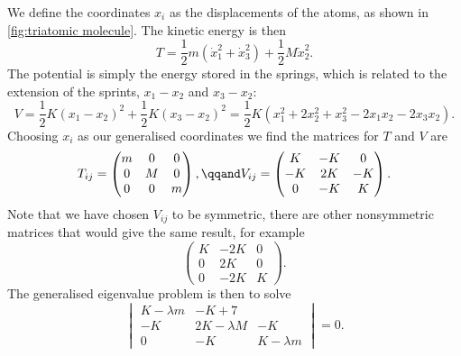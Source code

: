 \documentclass[fleqn]{NotesClass}
\begin{document}
    We define the coordinates \(x_i\) as the displacements of the atoms, as shown in \cref{fig:triatomic molecule}.
    The kinetic energy is then
    \begin{equation}
        T = \frac{1}{2}m(\dot{x}_1^2 + \dot{x}_3^2) + \frac{1}{2}M\dot{x}_2^2.
    \end{equation}
    The potential is simply the energy stored in the springs, which is related to the extension of the sprints, \(x_1 - x_2\) and \(x_3 - x_2\):
    \begin{equation}
        V = \frac{1}{2}K(x_1 - x_2)^2 + \frac{1}{2}K(x_3 - x_2)^2 = \frac{1}{2}K(x_1^2 + 2x_2^2 + x_3^2 - 2x_1x_2 - 2x_3x_2).
    \end{equation}
    Choosing \(x_i\) as our generalised coordinates we find the matrices for \(T\) and \(V\) are
    \begin{equation}
        T_{ij} = 
        \begin{pmatrix}
            m & 0 & 0\\
            0 & M & 0\\
            0 & 0 & m
        \end{pmatrix}
        , \qqand V_{ij} = 
        \begin{pmatrix}
            K & -K & 0\\
            -K & 2K & -K\\
            0 & -K & K
        \end{pmatrix}
        .
    \end{equation}
    Note that we have chosen \(V_{ij}\) to be symmetric, there are other nonsymmetric matrices that would give the same result, for example
    \begin{equation}
        \begin{pmatrix}
            K & -2K & 0\\
            0 & 2K & 0\\
            0 & -2K & K
        \end{pmatrix}
        .
    \end{equation}
    The generalised eigenvalue problem is then to solve
    \begin{equation}
        \begin{vmatrix}
            K - \lambda m & -K + 7\\
            -K & 2K - \lambda M & -K\\
            0 & -K & K - \lambda m
        \end{vmatrix}
        = 0.
    \end{equation}
\end{document}
